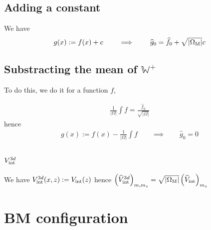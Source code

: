 \documentclass[11pt,a4paper,reqno,french,tikz]{amsart}
\newcommand{\pa}[1]{\left( #1 \right)} %
\newcommand{\ab}[1]{\left|#1\right|} %
\newcommand{\f}[2]{\frac{#1}{#2}} %
\newcommand{\ind}[1]{_{\textup{#1}}} %
\def\bbW{{\mathbb W}}
\newcommand{\sqom}{\sqrt{\ab{\Omega\ind{M}}}}
\begin{document}
\subsection{Adding a constant}%
\label{sub:adding_a_constant}
We have
\begin{align*}
g(x) := f(x) + c \qquad \implies \qquad \widehat{g}_0 = \widehat{f}_0 + \sqom c
\end{align*}

\subsection{Substracting the mean of $\bbW^+$}%
\label{sub:substracting_the_mean_of_bbw_}

To do this, we do it for a function $f$, 

\begin{align*}
\frac{1}{\ab{\Omega}} \int f = \f{\widehat{f}_{0}}{\sqrt{\ab{\Omega}}}
\end{align*}
hence
\begin{align*}
g(x) := f(x) -  \frac{1}{\ab{\Omega}} \int f \qquad \implies \qquad \widehat{g}_0 = 0
\end{align*}


\subsection{$V\ind{int}^{3d}$}%
\label{sub:_v__int}

We have $V\ind{int}^{3d}(x,z) := V\ind{int}(z)$ hence $\pa{\widehat{V}\ind{int}^{3d}}_{m,m_z} = \sqom \pa{\widehat{V}\ind{int}}_{m_z}$





\section{BM configuration}%
\label{sec:bm_configuration}
\end{document}
